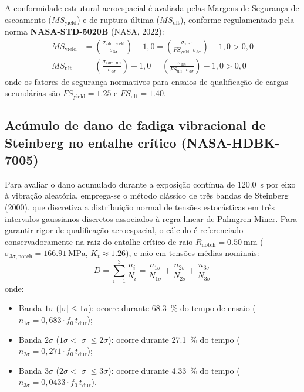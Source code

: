 A conformidade estrutural aeroespacial é avaliada pelas Margens de Segurança de escoamento ($MS_{\text{yield}}$) e de ruptura última ($MS_{\text{ult}}$), conforme regulamentado pela norma \textbf{NASA-STD-5020B} (NASA, 2022):
\begin{align}
  MS_{\text{yield}} &= \left( \frac{\sigma_{\text{adm, yield}}}{\sigma_{3\sigma}} \right) - 1{,}0 = \left( \frac{\sigma_{\text{yield}}}{FS_{\text{yield}} \cdot \sigma_{3\sigma}} \right) - 1{,}0 > 0{,}0 \label{eq:ms-rev-yield} \\
  MS_{\text{ult}} &= \left( \frac{\sigma_{\text{adm, ult}}}{\sigma_{3\sigma}} \right) - 1{,}0 = \left( \frac{\sigma_{\text{ult}}}{FS_{\text{ult}} \cdot \sigma_{3\sigma}} \right) - 1{,}0 > 0{,}0 \label{eq:ms-rev-ult}
\end{align}
onde os fatores de segurança normativos para ensaios de qualificação de cargas secundárias são $FS_{\text{yield}} = \num{1.25}$ e $FS_{\text{ult}} = \num{1.40}$.

\subsection{Acúmulo de dano de fadiga vibracional de Steinberg no entalhe crítico (NASA-HDBK-7005)}
\label{subsec:rev-steinberg}

Para avaliar o dano acumulado durante a exposição contínua de \SI{120.0}{\second} por eixo à vibração aleatória, emprega-se o método clássico de três bandas de Steinberg (2000), que discretiza a distribuição normal de tensões estocásticas em três intervalos gaussianos discretos associados à regra linear de Palmgren-Miner. Para garantir rigor de qualificação aeroespacial, o cálculo é referenciado conservadoramente na raiz do entalhe crítico de raio $R_{\text{notch}} = \SI{0.50}{\milli\metre}$ ($\sigma_{3\sigma,\text{notch}} = \SI{166.91}{\mega\pascal}$, $K_t \approx \num{1.26}$), e não em tensões médias nominais:
\begin{equation}
  D = \sum_{i=1}^{3} \frac{n_i}{N_i} = \frac{n_{1\sigma}}{N_{1\sigma}} + \frac{n_{2\sigma}}{N_{2\sigma}} + \frac{n_{3\sigma}}{N_{3\sigma}}
  \label{eq:miner-rev}
\end{equation}
onde:
\begin{itemize}
  \item Banda $1\sigma$ ($|\sigma| \le 1\sigma$): ocorre durante \SI{68.3}{\percent} do tempo de ensaio ($n_{1\sigma} = 0{,}683 \cdot f_0\, t_{\text{dur}}$);
  \item Banda $2\sigma$ ($1\sigma < |\sigma| \le 2\sigma$): ocorre durante \SI{27.1}{\percent} do tempo ($n_{2\sigma} = 0{,}271 \cdot f_0\, t_{\text{dur}}$);
  \item Banda $3\sigma$ ($2\sigma < |\sigma| \le 3\sigma$): ocorre durante \SI{4.33}{\percent} do tempo ($n_{3\sigma} = 0{,}0433 \cdot f_0\, t_{\text{dur}}$).
\end{itemize}

